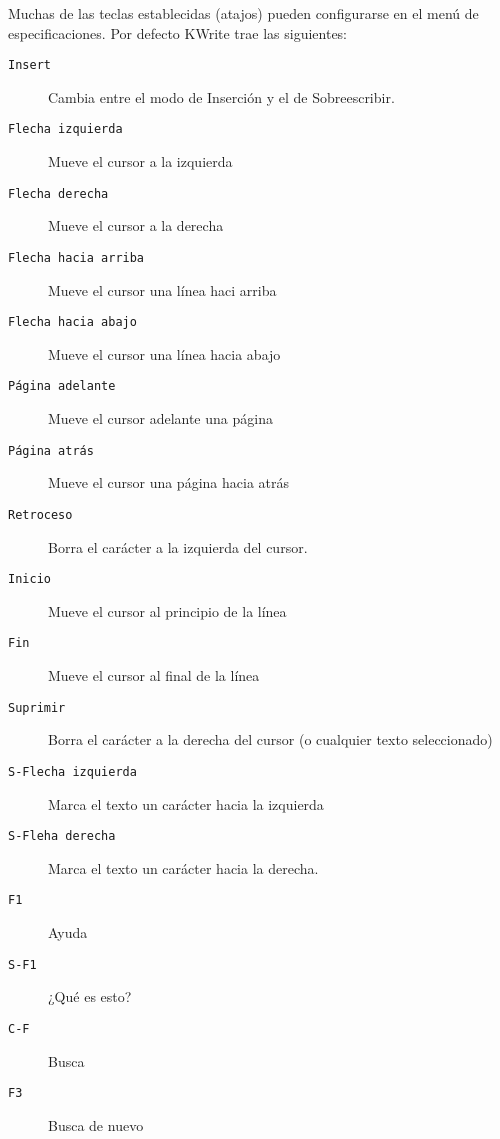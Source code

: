 Muchas de las  teclas establecidas (atajos) pueden  configurarse en el
menú de especificaciones. Por defecto {\sf KWrite} trae las siguientes:

\begin{description}

\item[{\tt  Insert}]  Cambia  entre  el  modo de  Inserción  y  el  de
Sobreescribir.

\item[{\tt Flecha izquierda}] Mueve el cursor a la izquierda

\item[{\tt Flecha derecha}] Mueve el cursor a la derecha

\item[{\tt Flecha hacia arriba}] Mueve el cursor una línea haci arriba

\item[{\tt Flecha hacia abajo}] Mueve el cursor una línea hacia abajo

\item[{\tt Página adelante}] Mueve el cursor adelante una página

\item[{\tt Página atrás}] Mueve el cursor una página hacia atrás

\item[{\tt Retroceso}] Borra el carácter a la izquierda del cursor.

\item[{\tt Inicio}] Mueve el cursor al principio de la línea

\item[{\tt Fin}] Mueve el cursor al final de la línea

\item[{\tt Suprimir}]  Borra el  carácter a la  derecha del  cursor (o
cualquier texto seleccionado)

\item[{\tt S-Flecha  izquierda}] Marca el  texto un carácter  hacia la
izquierda

\item[{\tt  S-Fleha derecha}]  Marca  el texto  un  carácter hacia  la
derecha.

\item[{\tt F1}] Ayuda

\item[{\tt S-F1}] ¿Qué es esto?

\item[{\tt C-F}] Busca

\item[{\tt F3}] Busca de nuevo


\end{description}
